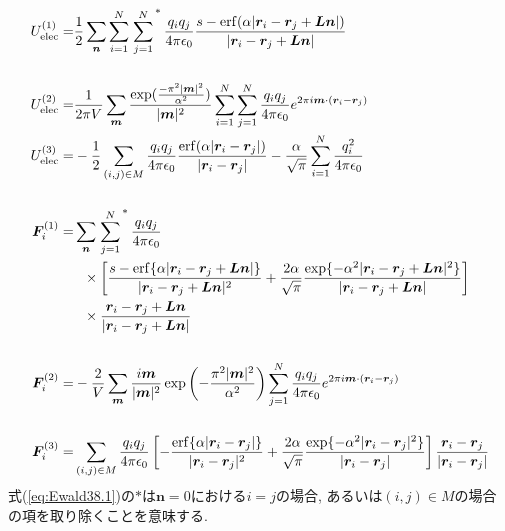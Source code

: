  \begin{align}
     U_{\mathrm{elec}}^{(1)}
  =&
     \frac{1}{2} \sum_{\bm{n}} \sum_{i=1}^{N} \left.\sum_{j=1}^{N}\right.^{*}
     \frac{q_{i}q_{j}}{4 \pi \epsilon_{0}}
     \frac{s - \mathrm{erf}(\alpha |\bm{r}_{i} - \bm{r}_{j} + \bm{Ln}| )}
          {|\bm{r}_{i} - \bm{r}_{j} + \bm{Ln}|}
  \label{eq:Ewald38.1}
  \\
  \notag
  \\
     U_{\mathrm{elec}}^{(2)}
  =&
      \frac{1}{2 \pi V} \sum_{\bm{m}}
      \frac{\exp(\frac{- \pi^{2}|\bm{m}|^{2}}{\alpha^{2}})}{|\bm{m}|^{2}}
      \sum_{i=1}^{N} \sum_{j=1}^{N}
      \frac{q_{i}q_{j}}{4 \pi \epsilon_{0}}
       e^{2 \pi i \bm{m} \cdot (\bm{r}_{i} - \bm{r}_{j})}
  \label{eq:Ewald38.2}
  \\
      U_{\mathrm{elec}}^{(3)}
  =&
    -\frac{1}{2} \sum_{(i,j) \in M}
     \frac{q_{i}q_{j}}{4 \pi \epsilon_{0}}
     \frac{\mathrm{erf}(\alpha |\bm{r}_{i} - \bm{r}_{j}|)}
          {|\bm{r}_{i} - \bm{r}_{j}|}
    -\frac{\alpha}{\sqrt{\pi}} \sum_{i=1}^{N}\frac{q_{i}^{2}}{4 \pi \epsilon_{0}}
  \label{eq:Ewald38.3}
  \\
  \notag
  \\
     \bm{F}_{i}^{(1)}
  =&
     \sum_{\bm{n}} \left. \sum_{j=1}^{N} \right.^{*}
     \frac{q_{i}q_{j}}{4 \pi \epsilon_{0}}
  \notag
  \\
  &~~\times
     \left[
            \frac{s-\mathrm{erf} \{ \alpha |\bm{r}_{i} - \bm{r}_{j} + \bm{Ln}| \} }
                 {|\bm{r}_{i} - \bm{r}_{j} + \bm{Ln}|^{2}}
           +\frac{2 \alpha}{\sqrt{\pi}}
            \frac{\exp \{ -\alpha^{2} |\bm{r}_{i} - \bm{r}_{j} + \bm{Ln}|^{2} \}}
                 {|\bm{r}_{i} - \bm{r}_{j} + \bm{Ln}|}
     \right]
  \notag
  \\
  &~~\times
     \frac{ \bm{r}_{i} - \bm{r}_{j} + \bm{Ln} }
          {|\bm{r}_{i} - \bm{r}_{j} + \bm{Ln}|}
  \label{eq:Ewald38.4}
  \\
  \notag
  \\
     \bm{F}_{i}^{(2)}
  =&
    -\frac{2}{ V}
     \sum_{\bm{m}} \frac{i \bm{m}}{|\bm{m}|^{2}}
     \exp \left( -\frac{ \pi^{2}|\bm{m}|^{2} }{ \alpha^{2} } \right)
     \sum_{j=1}^{N}
     \frac{q_{i}q_{j}}{4 \pi \epsilon_{0}}
     e^{2 \pi i \bm{m} \cdot (\bm{r}_{i} - \bm{r}_{j})}
  \label{eq:Ewald38.5}
  \\
  \notag
  \\
     \bm{F}_{i}^{(3)}
  =&
     \sum_{(i,j) \in M}
     \frac{q_{i}q_{j}}{4 \pi \epsilon_{0}}
     \left[
           -\frac{\mathrm{erf} \{ \alpha |\bm{r}_{i} - \bm{r}_{j}| \} }
                 {|\bm{r}_{i} - \bm{r}_{j}|^{2}}
           +\frac{2 \alpha}{\sqrt{\pi}}
            \frac{\exp \{ -\alpha^{2} |\bm{r}_{i} - \bm{r}_{j}|^{2} \}}
                 {|\bm{r}_{i} - \bm{r}_{j}|}
     \right]
     \frac{\bm{r}_{i} - \bm{r}_{j}}
          {|\bm{r}_{i} - \bm{r}_{j}|}
\end{align}
式(\ref{eq:Ewald38.1})の$*$は$\bm{n} = 0$における$i=j$の場合, あるいは$(i,j) \in M$の場合
の項を取り除くことを意味する.

